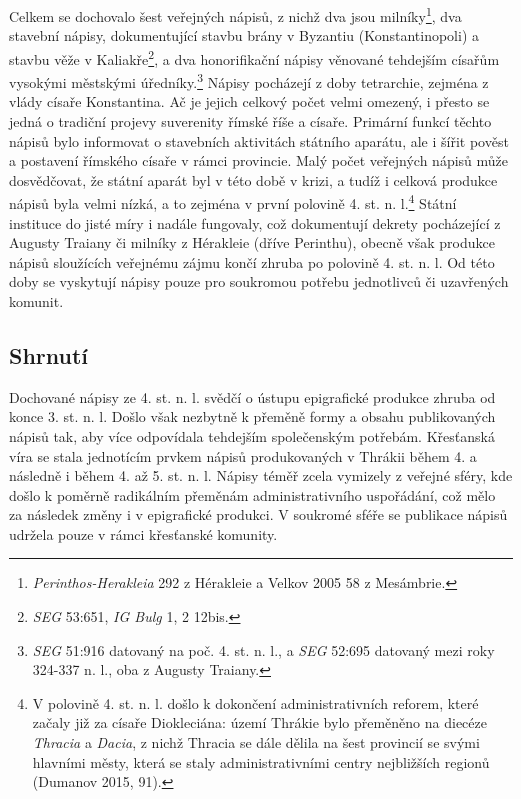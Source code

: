 Celkem se dochovalo šest veřejných nápisů, z nichž dva jsou milníky\footnote{{\em Perinthos-Herakleia} 292 z Hérakleie a Velkov 2005 58 z Mesámbrie.}, dva stavební nápisy, dokumentující stavbu brány v Byzantiu (Konstantinopoli) a stavbu věže v Kaliakře\footnote{{\em SEG} 53:651, {\em IG Bulg} 1, 2 12bis.}, a dva honorifikační nápisy věnované tehdejším císařům vysokými městskými úředníky.\footnote{{\em SEG} 51:916 datovaný na poč. 4. st. n. l., a {\em SEG} 52:695 datovaný mezi roky 324-337 n. l., oba z Augusty Traiany.} Nápisy pocházejí z doby tetrarchie, zejména z vlády císaře Konstantina. Ač je jejich celkový počet velmi omezený, i přesto se jedná o tradiční projevy suverenity římské říše a císaře. Primární funkcí těchto nápisů bylo informovat o stavebních aktivitách státního aparátu, ale i šířit pověst a postavení římského císaře v rámci provincie. Malý počet veřejných nápisů může dosvědčovat, že státní aparát byl v této době v krizi, a tudíž i celková produkce nápisů byla velmi nízká, a to zejména v první polovině 4. st. n. l.\footnote{V polovině 4. st. n. l. došlo k dokončení administrativních reforem, které začaly již za císaře Diokleciána: území Thrákie bylo přeměněno na diecéze {\em Thracia} a {\em Dacia}, z nichž Thracia se dále dělila na šest provincií se svými hlavními městy, která se staly administrativními centry nejbližších regionů (Dumanov 2015, 91).} Státní instituce do jisté míry i nadále fungovaly, což dokumentují dekrety pocházející z Augusty Traiany či milníky z Hérakleie (dříve Perinthu), obecně však produkce nápisů sloužících veřejnému zájmu končí zhruba po polovině 4. st. n. l. Od této doby se vyskytují nápisy pouze pro soukromou potřebu jednotlivců či uzavřených komunit.

\subsection[shrnutí-21]{Shrnutí}

Dochované nápisy ze 4. st. n. l. svědčí o ústupu epigrafické produkce zhruba od konce 3. st. n. l. Došlo však nezbytně k přeměně formy a obsahu publikovaných nápisů tak, aby více odpovídala tehdejším společenským potřebám. Křesťanská víra se stala jednotícím prvkem nápisů produkovaných v Thrákii během 4. a následně i během 4. až 5. st. n. l. Nápisy téměř zcela vymizely z veřejné sféry, kde došlo k poměrně radikálním přeměnám administrativního uspořádání, což mělo za následek změny i v epigrafické produkci. V soukromé sféře se publikace nápisů udržela pouze v rámci křesťanské komunity.


